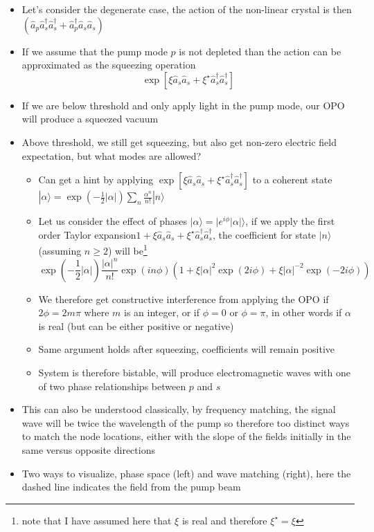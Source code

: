 \documentclass[english]{article}
\newcommand{\ket}[1]{|#1 \rangle}
\begin{document}
\begin{itemize}
\item Let's consider the degenerate case, the action of the non-linear crystal is then $\left(\hat{a}_p\hat{a}^\dagger_s\hat{a}^\dagger_s+\hat{a}^\dagger_p\hat{a}_s\hat{a}_s\right)$
\item If we assume that the pump mode $p$ is not depleted than the action can be approximated as the squeezing operation
\begin{equation}
\exp\left[\xi\hat{a}_s\hat{a}_s+\xi^\star \hat{a}^\dagger_s\hat{a}^\dagger_s\right]
\end{equation}
\item If we are below threshold and only apply light in the pump mode, our OPO will produce a squeezed vacuum
\item Above threshold, we still get squeezing, but also get non-zero electric field expectation, but what modes are allowed?
\begin{itemize}
\item Can get a hint by applying $\exp\left[\xi\hat{a}_s\hat{a}_s+\xi^\star \hat{a}^\dagger_s\hat{a}^\dagger_s\right]$ to a coherent state $\ket{\alpha}=\exp(-\frac{1}{2}|\alpha|)\sum_n\frac{\alpha^n}{n!}\ket{n}$
\item Let us consider the effect of phases $\ket{\alpha}=\ket{e^{i\phi}|\alpha|}$, if we apply  the first order Taylor expansion$1+\xi\hat{a}_s\hat{a}_s+\xi^\star \hat{a}^\dagger_s\hat{a}^\dagger_s$, the coefficient for state $\ket{n}$ (assuming $n\ge 2$) will be\footnote{note that I have assumed here that $\xi$ is real and therefore $\xi^\star=\xi$}
\begin{equation}
 \exp(-\frac{1}{2}|\alpha|)\frac{|\alpha|^n}{n!}\exp(i n \phi)\left(1+\xi|\alpha|^2\exp(2i\phi)+\xi|\alpha|^{-2}\exp(-2i\phi)\right)
\end{equation}
\item We therefore get constructive interference from applying the OPO if $2\phi=2m\pi$ where $m$ is an integer, or if $\phi=0$ or $\phi=\pi$, in other words if $\alpha$ is real (but can be either positive or negative)
\item Same argument holds after squeezing, coefficients will remain positive
\item System is therefore bistable, will produce electromagnetic waves with one of two phase relationships between $p$ and $s$
\end{itemize}
\item This can also be understood classically, by frequency matching, the signal wave will be twice the wavelength of the pump so therefore too distinct ways to match the node locations, either with the slope of the fields initially in the same versus opposite directions 
\item Two ways to visualize, phase space (left) and wave matching (right), here the dashed line indicates the field from the pump beam


\end{itemize}
\end{document}
